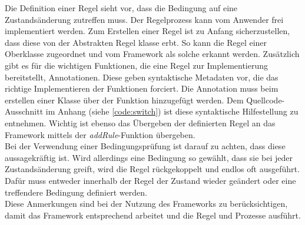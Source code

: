         Die Definition einer Regel sieht vor, dass die Bedingung auf eine Zustandsänderung zutreffen muss. Der Regelprozess kann vom Anwender 
        frei implementiert werden. Zum Erstellen einer Regel ist zu Anfang sicherzustellen, dass diese von der Abstrakten Regel klasse erbt. So kann die Regel einer 
        Oberklasse zugeordnet und vom Framework als solche erkannt werden. Zusätzlich gibt es für die wichtigen Funktionen, die eine Regel zur 
        Implementierung bereitstellt, Annotationen. Diese geben syntaktische Metadaten vor, die das richtige Implementieren der Funktionen forciert. Die 
        Annotation muss beim erstellen einer Klasse über der Funktion hinzugefügt werden. Dem Quellcode-Ausschnitt im Anhang (siehe \ref{code:switch}) ist diese 
        syntaktische Hilfestellung zu entnehmen. Wichtig ist ebenso das Übergeben der definierten Regel an das Framework mittels der \textit{addRule}-Funktion 
        übergeben. 
        \\
        Bei der Verwendung einer Bedingungsprüfung ist darauf zu achten, dass diese aussagekräftig ist. Wird allerdings eine Bedingung so gewählt, dass sie bei jeder Zustandsänderung greift, wird die 
        Regel rückgekoppelt und endlos oft ausgeführt. Dafür muss entweder innerhalb der Regel der Zustand wieder geändert oder eine treffendere Bedingung definiert werden.
        \\
        Diese Anmerkungen sind bei der Nutzung des Frameworks zu berücksichtigen, damit das Framework entsprechend arbeitet und die Regel und Prozesse ausführt. 
    
    
